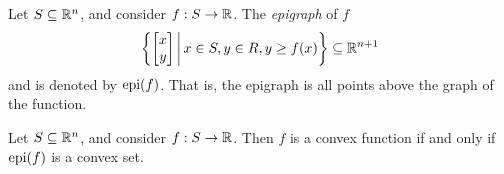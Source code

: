 \begin{defn}
    Let $S \subseteq \mathbb{R}^n$, and consider $f: S \to \mathbb{R}$. The \emph{epigraph} of $f$ 
    \begin{align*}
        \left\{\begin{bmatrix}
            x \\ y
        \end{bmatrix} \,\middle|\, x \in S, y \in R, y \geq f(x)\right\} \subseteq \mathbb{R}^{n+1}
    \end{align*}
    and is denoted by $\operatorname{epi}(f)$. That is, the epigraph is all points above the graph of the function.
\end{defn}

\begin{prop}\label{epigraph-convexity}
    Let $S \subseteq \mathbb{R}^n$, and consider $f: S \to \mathbb{R}$. Then $f$ is a convex function if and only if $\operatorname{epi}(f)$ is a convex set.
\end{prop}

